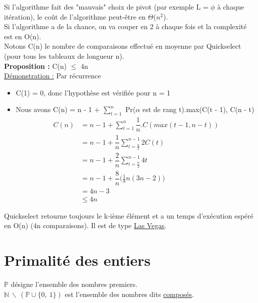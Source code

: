 \documentclass[12pt,a4paper]{article}
\begin{document}
Si l'algorithme fait des "mauvais" choix de pivot (par exemple L = $\phi$ à chaque itération), le coût de l'algorithme peut-être en $\Theta$($n^2$).\\
Si l'algorithme a de la chance, on va couper en 2 à chaque fois et la complexité est en O(n).\\
Notons C(n) le nombre de comparaisons effectué en moyenne par Quickselect (pour tous les tableaux de longueur n).\\
\textbf{Proposition :} C(n) $\leq$ 4n\\
\underline{Démonstration :} Par récurrence
\begin{itemize}
	\item C(1) = 0, donc l'hypothèse est vérifiée pour n = 1
	\item Nous avons C(n) = n - 1 + $\sum\limits_{t = 1}^{n}$ Pr($\alpha$ est de rang t).max(C(t - 1), C(n - t)
	\begin{equation} 
	\begin{split}\nonumber
	C(n) &= n - 1 + \sum\limits_{t = 1}^{n} \dfrac{1}{n} . C(max(t- 1, n - t))\\
	&= n - 1 + \dfrac{1}{n}	\sum\limits_{t = \frac{n}{2}}^{n - 1} 2C(t)\\
	&= n - 1 + \dfrac{2}{n}	\sum\limits_{t = \frac{n}{2}}^{n - 1} 4t\\
	&= n - 1 + \dfrac{8}{n} \bigg(\frac{1}{8}n(3n - 2)\bigg)\\
	&= 4n - 3\\
	&\leq 4n
	\end{split}
	\end{equation}
\end{itemize}
Quickselect retourne toujours le k-ième élément et a un temps d'exécution espéré en O(n) (4n comparaisons). Il est de type \underline{Las Vegas}.
\section{Primalité des entiers}
$\mathbb{P}$ désigne l'ensemble des nombres premiers.\\
$\mathbb{N}\ \backslash \ (\mathbb{P} \cup \{0,\ 1\})$ est l'ensemble des nombres dits \underline{composés}.
\end{document}
